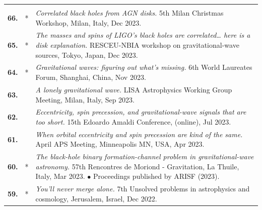 {\begin{longtable}{rp{0.3cm}p{15.8cm}}
\vspace{0.05cm}\\
%
\textbf{66.} & * & \textit{Correlated black holes from AGN disks.}
\newline{}
5th Milan Christmas Workshop, Milan, Italy, Dec 2023.
\vspace{0.05cm}\\
%
\textbf{65.} & * & \textit{The masses and spins of LIGO's black holes are correlated… here is a disk explanation.}
\newline{}
RESCEU-NBIA workshop on gravitational-wave sources, Tokyo, Japan, Dec 2023.
\vspace{0.05cm}\\
%
\textbf{64.} & * & \textit{Gravitational waves: figuring out what’s missing.}
\newline{}
6th World Laureates Forum, Shanghai, China, Nov 2023.
\vspace{0.05cm}\\
%
\textbf{63.} &  & \textit{A lonely gravitational wave.}
\newline{}
LISA Astrophysics Working Group Meeting, Milan, Italy, Sep 2023.
\vspace{0.05cm}\\
%
\textbf{62.} &  & \textit{Eccentricity, spin precession, and gravitational-wave signals that are too short.}
\newline{}
15th Edoardo Amaldi Conference, (online), Jul 2023.
\vspace{0.05cm}\\
%
\textbf{61.} &  & \textit{When orbital eccentricity and spin precession are kind of the same.}
\newline{}
April APS Meeting, Minneapolis MN, USA, Apr 2023.
\vspace{0.05cm}\\
%
\textbf{60.} & * & \textit{The black-hole binary formation-channel problem in gravitational-wave astronomy.}
\newline{}
57th Rencontres de Moriond - Gravitation, La Thuile, Italy, Mar 2023.
\newline{}
\textcolor{color1}{$\bullet$} Proceedings published by ARISF (2023).
\vspace{0.05cm}\\
%
\textbf{59.} & * & \textit{You’ll never merge alone.}
\newline{}
7th Unsolved problems in astrophysics and cosmology, Jerusalem, Israel, Dec 2022.
\vspace{0.05cm}\\

\end{longtable}}

